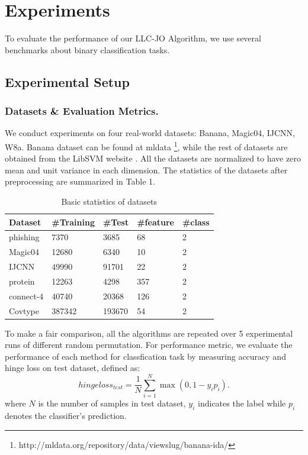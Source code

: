 \documentclass{llncs}
\begin{document}
	\section{Experiments}
	To evaluate the performance of our LLC-JO Algorithm, we use several benchmarks about binary classification tasks.
	\subsection{Experimental Setup}
	\subsubsection{Datasets \& Evaluation Metrics.}
	We conduct experiments on four real-world datasets: Banana, Magic04, IJCNN, W8a. Banana dataset can be found at mldata \footnote{http://mldata.org/repository/data/viewslug/banana-ida/}, while the rest of datasets are obtained from the LibSVM website \cite{15}.  All the datasets are normalized to have zero mean and unit variance in each dimension. The statistics of the datasets after preprocessing are summarized in Table 1.
	\begin{table}
		\centering
		\begin{tabu} to \textwidth {|X[c]| X[c]| X[c]| X[c]| X[c]|}
			\hline
			Dataset              & \#Training & \#Test & \#feature &\#class\\
			\hline
			phishing 		   	& 7370 		& 3685 		& 68 	& 2  \\
			Magic04     		& 12680 	& 6340 		& 10 	& 2  \\
			IJCNN           	& 49990 	& 91701 	& 22 	& 2  \\
			protein           	& 12263 	& 4298 		& 357 	& 2  \\
			connect-4           & 40740 	& 20368 	& 126 	& 2  \\
			Covtype           	& 387342 	& 193670 	& 54 	& 2  \\
			\hline
		\end{tabu}
		\caption{Basic statistics of datasets}
	\end{table}
	To make a fair comparison, all the algorithms are repeated over 5 experimental runs of different random permutation. For performance metric, we evaluate the performance of each method for classfication task by measuring accuracy and hinge loss on test dataset, defined as:
	\begin{equation*}
	hingeloss_{test} = \frac{1}{N}\sum_{i=1}^N\max(0,1-y_ip_i).
	\end{equation*}
	where $N$ is the number of samples in test dataset, $y_i$ indicates the label while $p_i$ denotes the classifier's prediction.
\end{document}
